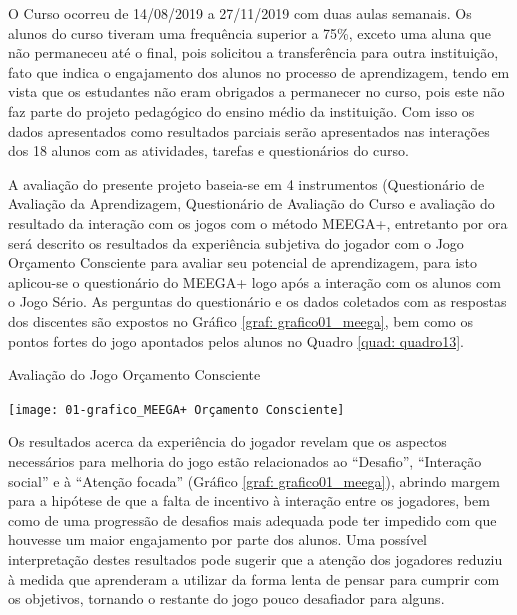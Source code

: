 O Curso ocorreu de 14/08/2019 a 27/11/2019 com duas aulas semanais. Os alunos do curso tiveram uma frequência superior a 75\%, exceto uma aluna que não permaneceu até o final, pois solicitou a transferência para outra instituição, fato que indica o engajamento dos alunos no processo de aprendizagem, tendo em vista que os estudantes não eram obrigados a permanecer no curso, pois este não faz parte do projeto pedagógico do ensino médio da instituição. Com isso os dados apresentados como resultados parciais serão apresentados nas interações dos 18 alunos com as atividades, tarefas e questionários do curso.

A avaliação do presente projeto baseia-se em 4 instrumentos (Questionário de Avaliação da Aprendizagem, Questionário de Avaliação do Curso e avaliação do resultado da interação com os jogos com o método MEEGA+, entretanto por ora será descrito os resultados da experiência subjetiva do jogador com o Jogo Orçamento Consciente para avaliar seu potencial de aprendizagem, para isto aplicou-se o questionário do MEEGA+ logo após a interação com os alunos com o Jogo Sério. As perguntas do questionário e os dados coletados com as respostas dos discentes são expostos no Gráfico \ref{graf: grafico01_meega}, bem como os pontos fortes do jogo apontados pelos alunos no Quadro \ref{quad: quadro13}.

\graphicspath{{graficos/}} 
\begin{grafico}[!ht]
\centering
\caption{Avaliação do Jogo Orçamento Consciente}
\centering
\texttt{[image: 01-grafico\_MEEGA+ Orçamento Consciente]}
\label{graf: grafico01_meega}
\end{grafico}

\newpage
Os resultados acerca da experiência do jogador revelam que os aspectos necessários para melhoria do jogo estão relacionados ao “Desafio”, “Interação social” e à “Atenção focada” (Gráfico \ref{graf: grafico01_meega}), abrindo margem para a hipótese de que a falta de incentivo à interação entre os jogadores, bem como de uma progressão de desafios mais adequada pode ter impedido com que houvesse um maior engajamento por parte dos alunos. Uma possível interpretação destes resultados pode sugerir que a atenção dos jogadores reduziu à medida que aprenderam a utilizar da forma lenta de pensar para cumprir com os objetivos, tornando o restante do jogo pouco desafiador para alguns.


